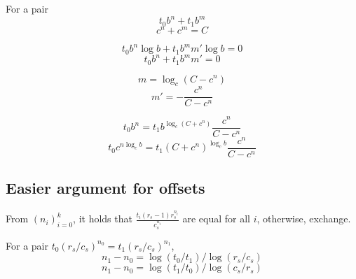 \documentclass{article}
\begin{document}
For a pair
\[ t_0 b^n + t_1 b^m \]
\[ c^n + c^m = C \]

\[ t_0 b^n \log b + t_1 b^m m' \log b = 0 \]
\[ t_0 b^n + t_1 b^m m' = 0 \]

\[ m = \log_c (C - c^n) \]
\[ m' = - \frac{c^n}{C - c^n} \]


\[ t_0 b^n = t_1 b^{\log_c (C + c^n)} \frac{c^n}{C - c^n} \]
\[ t_0 c^{n \log_c b} = t_1 (C + c^n)^{\log_c b} \frac{c^n}{C - c^n} \]


\subsection{Easier argument for offsets}
From $(n_i)_{i = 0}^k$, it holds that $\frac{t_i (r_s - 1) r_s^{n_i}}{c_s^{n_i}}$ are equal for all $i$,
otherwise, exchange.

For a pair $t_0 (r_s/c_s)^{n_0} = t_1 (r_s/c_s)^{n_1}$,
\[ n_1 - n_0 = \log(t_0/t_1) / \log(r_s/c_s) \]
\[ n_1 - n_0 = \log(t_1/t_0) / \log(c_s/r_s) \]
\end{document}
